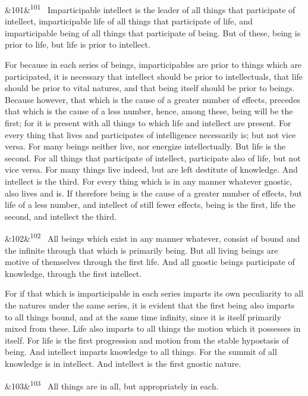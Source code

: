 \documentclass[12pt]{article}
\newcommand{\para}[1][]{\par\noindent\ifx&#1&\else\textsuperscript{\footnotesize #1}~\fi}
\begin{document}
\para[101] Imparticipable intellect is the leader of all things that participate of intellect, imparticipable life of all things that participate of life, and imparticipable being of all things that participate of being. But of these, being is prior to life, but life is prior to intellect.

For because in each series of beings, imparticipables are prior to things which are participated, it is necessary that intellect should be prior to intellectuals, that life should be prior to vital natures, and that being itself should be prior to beings. Because however, that which is the cause of a greater number of effects, precedes that which is the cause of a less number, hence, among these, being will be the first; for it is present with all things to which life and intellect are present. For every thing that lives and participates of intelligence necessarily is; but not vice versa. For many beings neither live, nor energize intellectually. But life is the second. For all things that participate of intellect, participate also of life, but not vice versa. For many things live indeed, but are left destitute of knowledge. And intellect is the third. For every thing which is in any manner whatever gnostic, also lives and is. If therefore being is the cause of a greater number of effects, but life of a less number, and intellect of still fewer effects, being is the first, life the second, and intellect the third.

\para[102] All beings which exist in any manner whatever, consist of bound and the infinite through that which is primarily being. But all living beings are motive of themselves through the first life. And all gnostic beings participate of knowledge, through the first intellect.

For if that which is imparticipable in each series imparts its own peculiarity to all the natures under the same series, it is evident that the first being also imparts to all things bound, and at the same time infinity, since it is itself primarily mixed from these. Life also imparts to all things the motion which it possesses in itself. For life is the first progression and motion from the stable hypostasis of being. And intellect imparts knowledge to all things. For the summit of all knowledge is in intellect. And intellect is the first gnostic nature.

\para[103] All things are in all, but appropriately in each.
\end{document}
